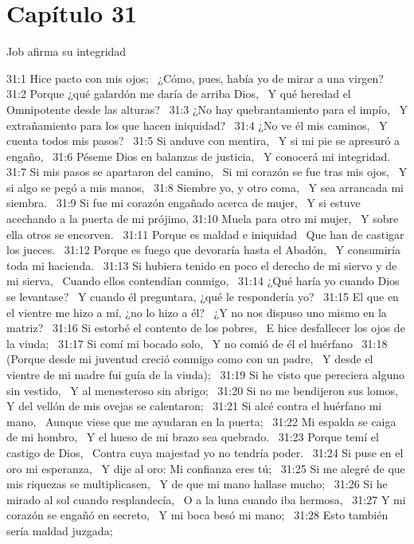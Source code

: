 \section*{Capítulo 31}
Job afirma su integridad  

31:1 Hice pacto con mis ojos;  
¿Cómo, pues, había yo de mirar a una virgen?  
31:2 Porque ¿qué galardón me daría de arriba Dios,  
Y qué heredad el Omnipotente desde las alturas?  
31:3 ¿No hay quebrantamiento para el impío,  
Y extrañamiento para los que hacen iniquidad?  
31:4 ¿No ve él mis caminos,  
Y cuenta todos mis pasos?  
31:5 Si anduve con mentira,  
Y si mi pie se apresuró a engaño,  
31:6 Péseme Dios en balanzas de justicia,  
Y conocerá mi integridad.  
31:7 Si mis pasos se apartaron del camino,  
Si mi corazón se fue tras mis ojos,  
Y si algo se pegó a mis manos,  
31:8 Siembre yo, y otro coma,  
Y sea arrancada mi siembra.  
31:9 Si fue mi corazón engañado acerca de mujer,  
Y si estuve acechando a la puerta de mi prójimo, 
31:10 Muela para otro mi mujer,  
Y sobre ella otros se encorven.  
31:11 Porque es maldad e iniquidad  
Que han de castigar los jueces.  
31:12 Porque es fuego que devoraría hasta el Abadón,  
Y consumiría toda mi hacienda.  
31:13 Si hubiera tenido en poco el derecho de mi siervo y de mi sierva,  
Cuando ellos contendían conmigo,  
31:14 ¿Qué haría yo cuando Dios se levantase?  
Y cuando él preguntara, ¿qué le respondería yo?  
31:15 El que en el vientre me hizo a mí, ¿no lo hizo a él?  
¿Y no nos dispuso uno mismo en la matriz?  
31:16 Si estorbé el contento de los pobres,  
E hice desfallecer los ojos de la viuda;  
31:17 Si comí mi bocado solo,  
Y no comió de él el huérfano  
31:18 (Porque desde mi juventud creció conmigo como con un padre,  
Y desde el vientre de mi madre fui guía de la viuda);  
31:19 Si he visto que pereciera alguno sin vestido,  
Y al menesteroso sin abrigo;  
31:20 Si no me bendijeron sus lomos,  
Y del vellón de mis ovejas se calentaron;  
31:21 Si alcé contra el huérfano mi mano,  
Aunque viese que me ayudaran en la puerta;  
31:22 Mi espalda se caiga de mi hombro,  
Y el hueso de mi brazo sea quebrado.  
31:23 Porque temí el castigo de Dios,  
Contra cuya majestad yo no tendría poder.  
31:24 Si puse en el oro mi esperanza,  
Y dije al oro: Mi confianza eres tú;  
31:25 Si me alegré de que mis riquezas se multiplicasen,  
Y de que mi mano hallase mucho;  
31:26 Si he mirado al sol cuando resplandecía,  
O a la luna cuando iba hermosa,  
31:27 Y mi corazón se engañó en secreto,  
Y mi boca besó mi mano;  
31:28 Esto también sería maldad juzgada;  
